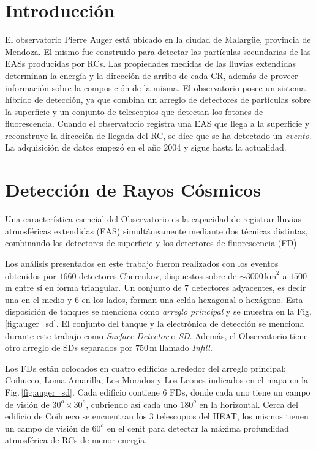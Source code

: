 

\section{Introducción}

{El observatorio Pierre Auger está ubicado en la ciudad de Malargüe, provincia de Mendoza. El mismo fue construido para detectar las partículas secundarias de las EASs producidas por RCs.  Las propiedades medidas de las lluvias extendidas determinan la energía y la dirección de arribo de cada CR, además de proveer información sobre  la composición de la  misma. El observatorio posee un sistema híbrido de detección, ya que combina un arreglo de detectores de partículas sobre la superficie y un conjunto de telescopios que detectan los fotones de fluorescencia. Cuando el observatorio  registra una EAS que llega a la superficie y reconstruye la dirección de llegada del RC, se dice que se ha detectado un \textit{evento}. La adquisición de datos empezó en el año 2004 y sigue hasta la actualidad.}


\section{Detección de Rayos Cósmicos}
Una característica esencial del Observatorio es la capacidad de registrar lluvias atmosféricas extendidas (EAS) simultáneamente mediante dos técnicas distintas, combinando los detectores de superficie y los detectores de fluorescencia (FD). 


Los análisis presentados en este trabajo fueron realizados con los eventos obtenidos por $ 1660$ detectores Cherenkov, dispuestos sobre de $\sim 3000\,\text{km}^2$ a $1500\,$m entre sí en forma triangular. Un conjunto de 7 detectores adyacentes, es decir una en el medio y 6 en los lados, forman una celda hexagonal o hexágono. Esta disposición de tanques se menciona como \textit{arreglo principal} y se muestra en la Fig.\,\ref{fig:auger_sd}. El conjunto del tanque y la electrónica de detección  se menciona durante este trabajo como \textit{Surface Detector} o \textit{SD}. Además, el Observatorio tiene otro arreglo de SDs separados por $750\,$m llamado \emph{Infill}.

Los FDs están colocados en cuatro edificios alrededor del arreglo principal: Coihueco, Loma Amarilla, Los Morados y Los Leones indicados en el mapa en la Fig.\,\ref{fig:auger_sd}. Cada edificio contiene 6 FDs, donde cada uno tiene un campo de visión de $30^o\times30^o$, cubriendo así cada uno $180^o$ en la horizontal. Cerca del edificio de Coihueco se encuentran los 3 telescopios del HEAT, los mismos tienen un campo de visión de $60^o$ en el cenit para detectar la máxima profundidad atmosférica de RCs de menor energía.

